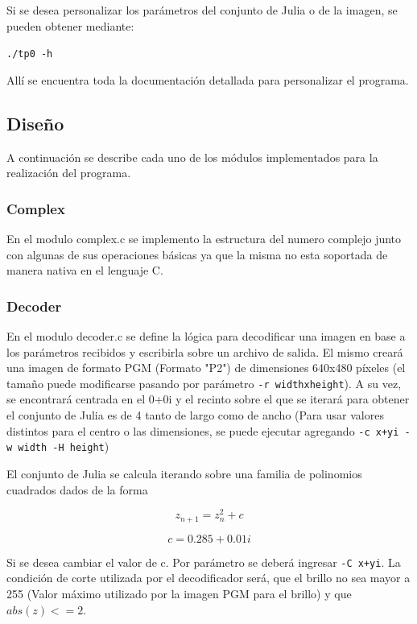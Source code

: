 \documentclass[10pt,a4paper]{article}
\begin{document}
Si se desea personalizar los parámetros del conjunto de Julia o de la imagen, se pueden obtener mediante:

\texttt{./tp0 -h}

Allí se encuentra toda la documentación detallada para personalizar el programa.

\subsection{Diseño}
A continuación se describe cada uno de los módulos implementados para la realización del programa.

\subsubsection{Complex}
En el modulo complex.c se implemento la estructura del numero complejo junto con algunas de sus operaciones básicas ya que la misma no esta soportada de manera nativa en el lenguaje C.

\subsubsection{Decoder}
En el modulo decoder.c se define la lógica para decodificar una imagen en base a los parámetros recibidos y escribirla sobre un archivo de salida. El mismo creará una imagen de formato PGM (Formato "P2") de dimensiones 640x480 píxeles (el tamaño puede modificarse pasando por parámetro \texttt{-r widthxheight}). A su vez, se encontrará centrada en el 0+0i y el recinto sobre el que se iterará para obtener el conjunto de Julia es de 4 tanto de largo como de ancho (Para usar valores distintos para el centro o las dimensiones, se puede ejecutar agregando \texttt{-c x+yi -w width -H height})

El conjunto de Julia se calcula iterando sobre una familia de polinomios cuadrados dados de la forma

$$z_{n+1} = z_{n}^{2} + c$$

$$c = 0.285 + 0.01i$$

Si se desea cambiar el valor de c. Por parámetro se deberá ingresar \texttt{-C x+yi}. La condición de corte utilizada por el decodificador será, que el brillo no sea mayor a 255 (Valor máximo utilizado por la imagen PGM para el brillo) y que $abs(z) <= 2$. 
\end{document}
